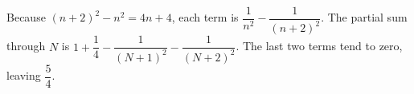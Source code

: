 Because $(n+2)^2-n^2=4n+4$, each term is $\dfrac{1}{n^2}-\dfrac{1}{(n+2)^2}$. The partial sum through $N$ is $1+\dfrac{1}{4}-\dfrac{1}{(N+1)^2}-\dfrac{1}{(N+2)^2}$. The last two terms tend to zero, leaving $\boxed{\dfrac{5}{4}}$.
